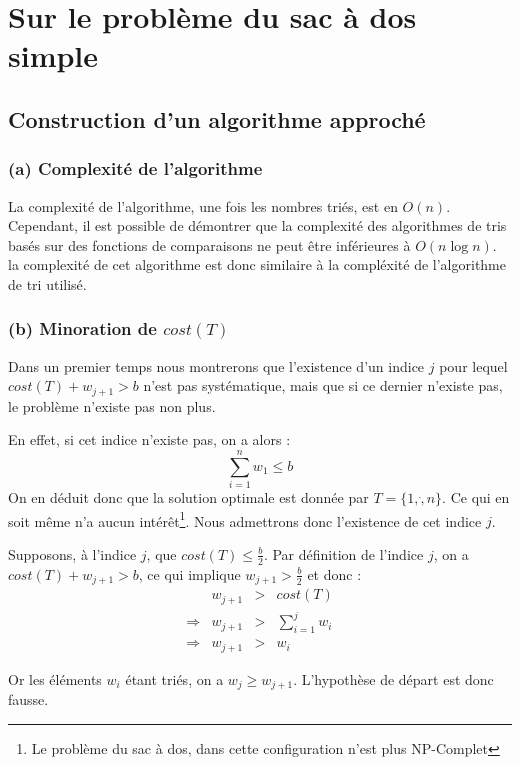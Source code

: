 \section{Sur le problème du sac à dos simple}

\subsection{Construction d'un algorithme approché}

\subsubsection{(a) Complexité de l'algorithme}

La complexité de l'algorithme, une fois les nombres triés, est en $O(n)$. Cependant, il est possible
de démontrer que la complexité des algorithmes de tris basés sur des fonctions de comparaisons ne
peut être inférieures à $O(n\log n)$. la complexité de cet algorithme est donc similaire à la
compléxité de l'algorithme de tri utilisé.

\subsubsection{(b) Minoration de $cost(T)$}

Dans un premier temps nous montrerons que l'existence d'un indice $j$ pour lequel $cost(T) + w_{j+1}
> b$ n'est pas systématique, mais que si ce dernier n'existe pas, le problème n'existe pas non plus.

En effet, si cet indice n'existe pas, on a alors : 
$$ \sum_{i=1}^n w_1 \leq b $$
On en déduit donc que la solution optimale est donnée par $ T = \{ 1, \dot, n \} $. Ce qui en soit
même n'a aucun intérêt\footnote{Le problème du sac à dos, dans cette configuration n'est plus
NP-Complet}. Nous admettrons donc l'existence de cet indice $j$.

Supposons, à l'indice $j$, que $cost(T) \leq \frac{b}{2}$. Par définition de l'indice $j$, on a
$cost(T) + w_{j+1} > b$, ce qui implique $w_{j+1} > \frac{b}{2}$ et donc : $$
\begin{array}{lrcl}
	& w_{j+1} & > & cost(T) \\
	\Rightarrow & w_{j+1} & > & \sum_{i=1}^j w_i \\
	\Rightarrow & w_{j+1} & > & w_i
\end{array}
$$

Or les éléments $w_i$ étant triés, on a $w_j \geq w_{j+1}$. L'hypothèse de départ est donc fausse.

